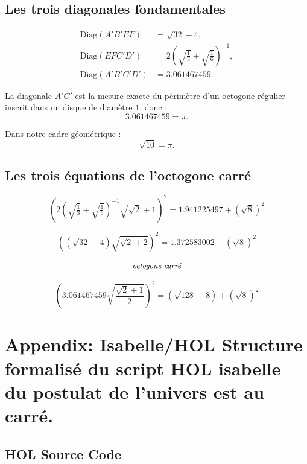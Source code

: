 \documentclass[12pt,a4paper]{article}
\begin{document}
\subsection{Les trois diagonales fondamentales}

\[
\begin{aligned}
\text{Diag}(A'B'EF) &= \sqrt{32} - 4, \\
\text{Diag}(EFC'D') &= 2\left(\sqrt{\tfrac13} + \sqrt{\tfrac16}\right)^{-1}, \\
\text{Diag}(A'B'C'D') &= 3.061467459.
\end{aligned}
\]

La diagonale $A'C'$ est la mesure exacte du périmètre d’un octogone régulier inscrit dans un disque de diamètre $1$, donc :
\[
3.061467459 = \pi.
\]

Dans notre cadre géométrique :
\[
\sqrt{10} = \pi.
\]

\subsection{Les trois équations de l’octogone carré}

\[
\boxed{
\left( 2\left(\sqrt{\tfrac13}+\sqrt{\tfrac16}\right)^{-1} \sqrt{\sqrt{2}+1} \right)^2
= 1.941225497 + (\sqrt{8})^2
}
\]

\[
\boxed{
\left( (\sqrt{32}-4)\sqrt{\sqrt{2}+2} \right)^2
= 1.372583002 + (\sqrt{8})^2
}
\]

\[
\text{\small\itshape octogone carré}
\]

\[
\boxed{
\left( 3.061467459 \sqrt{\frac{\sqrt{2}+1}{2}} \right)^2
= (\sqrt{128}-8) + (\sqrt{8})^2
}
\]

\section{Appendix: Isabelle/HOL Structure formalisé du script HOL isabelle du postulat de l'univers est au carré.}

\subsection*{HOL Source Code}
\end{document}
